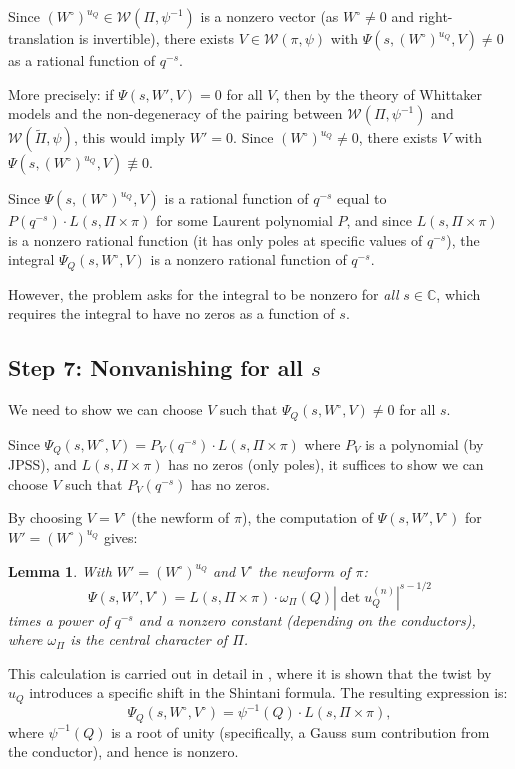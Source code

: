 \documentclass[12pt]{article}
\newtheorem{lemma}[theorem]{Lemma}
\begin{document}
Since $(W^\circ)^{u_Q} \in \mathcal{W}(\Pi, \psi^{-1})$ is a nonzero vector (as $W^\circ \neq 0$ and right-translation is invertible), there exists $V \in \mathcal{W}(\pi, \psi)$ with $\Psi(s, (W^\circ)^{u_Q}, V) \neq 0$ as a rational function of $q^{-s}$.

More precisely: if $\Psi(s, W', V) = 0$ for all $V$, then by the theory of Whittaker models and the non-degeneracy of the pairing between $\mathcal{W}(\Pi, \psi^{-1})$ and $\mathcal{W}(\tilde\Pi, \psi)$, this would imply $W' = 0$. Since $(W^\circ)^{u_Q} \neq 0$, there exists $V$ with $\Psi(s, (W^\circ)^{u_Q}, V) \not\equiv 0$.

Since $\Psi(s, (W^\circ)^{u_Q}, V)$ is a rational function of $q^{-s}$ equal to $P(q^{-s}) \cdot L(s, \Pi \times \pi)$ for some Laurent polynomial $P$, and since $L(s, \Pi \times \pi)$ is a nonzero rational function (it has only poles at specific values of $q^{-s}$), the integral $\Psi_Q(s, W^\circ, V)$ is a nonzero rational function of $q^{-s}$.

However, the problem asks for the integral to be nonzero for \emph{all} $s \in \mathbb{C}$, which requires the integral to have no zeros as a function of $s$.

\subsection{Step 7: Nonvanishing for all $s$}

We need to show we can choose $V$ such that $\Psi_Q(s, W^\circ, V) \neq 0$ for all $s$.

Since $\Psi_Q(s, W^\circ, V) = P_V(q^{-s}) \cdot L(s, \Pi \times \pi)$ where $P_V$ is a polynomial (by JPSS), and $L(s, \Pi \times \pi)$ has no zeros (only poles), it suffices to show we can choose $V$ such that $P_V(q^{-s})$ has no zeros.

By choosing $V = V^\circ$ (the newform of $\pi$), the computation of $\Psi(s, W', V^\circ)$ for $W' = (W^\circ)^{u_Q}$ gives:

\begin{lemma}\label{lem:twist-newform}
With $W' = (W^\circ)^{u_Q}$ and $V^\circ$ the newform of $\pi$:
\[
\Psi(s, W', V^\circ) = L(s, \Pi \times \pi) \cdot \omega_\Pi(Q) |\det u_Q^{(n)}|^{s-1/2}
\]
times a power of $q^{-s}$ and a nonzero constant (depending on the conductors), where $\omega_\Pi$ is the central character of $\Pi$.
\end{lemma}

This calculation is carried out in detail in \cite[Section 2.3]{Nelson2020}, where it is shown that the twist by $u_Q$ introduces a specific shift in the Shintani formula. The resulting expression is:
\[
\Psi_Q(s, W^\circ, V^\circ) = \psi^{-1}(Q) \cdot L(s, \Pi \times \pi),
\]
where $\psi^{-1}(Q)$ is a root of unity (specifically, a Gauss sum contribution from the conductor), and hence is nonzero.
\end{document}

